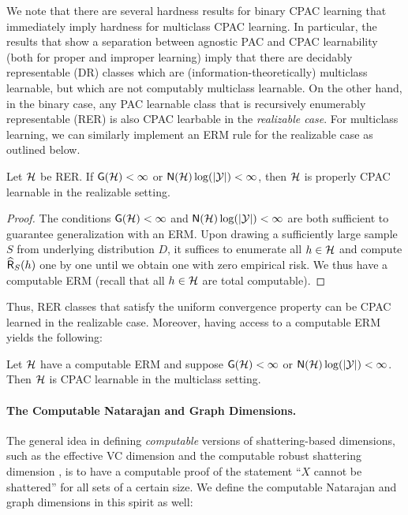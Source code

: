 \documentclass[11pt]{article}
\begin{document}
We note that there are several hardness results for binary CPAC learning that immediately imply hardness for multiclass CPAC learning. In particular, the results that show a separation between agnostic PAC and CPAC learnability (both for proper \citep{agarwal2020learnability} and improper \citep{sterkenburg2022characterizations} learning) imply that there are decidably representable (DR) classes which are (information-theoretically) multiclass learnable, but which are not computably multiclass learnable. 
On the other hand, in the binary case, any PAC learnable class that is recursively enumerably representable (RER) is also CPAC learbable in the \emph{realizable case}. 
For multiclass learning, we can similarly implement an ERM rule for the realizable case as outlined below. 
\begin{proposition}
\label{prop:rer-sufficient-cpac-realizable}
    Let $\mathcal{H}$ be RER. 
    If $\mathsf{G}(\mathcal{H})<\infty$ or $\mathsf{N}(\mathcal{H})\log(|\mathcal{Y}|)<\infty$, then $\mathcal{H}$ is properly CPAC learnable in the realizable setting.
\end{proposition}
    
\begin{proof}
    The conditions $\mathsf{G}(\mathcal{H})<\infty$ and $\mathsf{N}(\mathcal{H})\log(|\mathcal{Y}|)<\infty$ are both sufficient to guarantee generalization with an ERM.
    Upon drawing a sufficiently large sample $S$ from underlying distribution $D$, it suffices to enumerate all $h\in\mathcal{H}$ and compute $\widehat{\mathsf{R}}_S(h)$ one by one until we obtain one with zero empirical risk. 
    We thus have a computable ERM (recall that all $h\in\mathcal{H}$ are total computable). 
\end{proof}

Thus, RER classes that satisfy the uniform convergence property can be CPAC learned in the realizable case. 
Moreover, having access to a computable ERM yields the following: 

\begin{fact}
    \label{fact:c-erm+finite-Gdim-Ndim=cpac}
    Let $\mathcal{H}$ have a computable ERM and suppose $\mathsf{G}(\mathcal{H})<\infty$ or $\mathsf{N}(\mathcal{H})\log(|\mathcal{Y}|)<\infty$. 
    Then $\mathcal{H}$ is CPAC learnable in the multiclass setting.
\end{fact}


\paragraph{The Computable Natarajan and Graph Dimensions.}
The general idea in defining \emph{computable} versions of shattering-based dimensions, such as the effective VC dimension \citep{sterkenburg2022characterizations,delle2023find} and the computable robust shattering dimension \citep{gourdeau2024computability}, is to have a computable proof of the statement ``$X$ cannot be shattered'' for all sets of a certain size. 
We define the computable  Natarajan and graph dimensions in this spirit as well:
\end{document}
